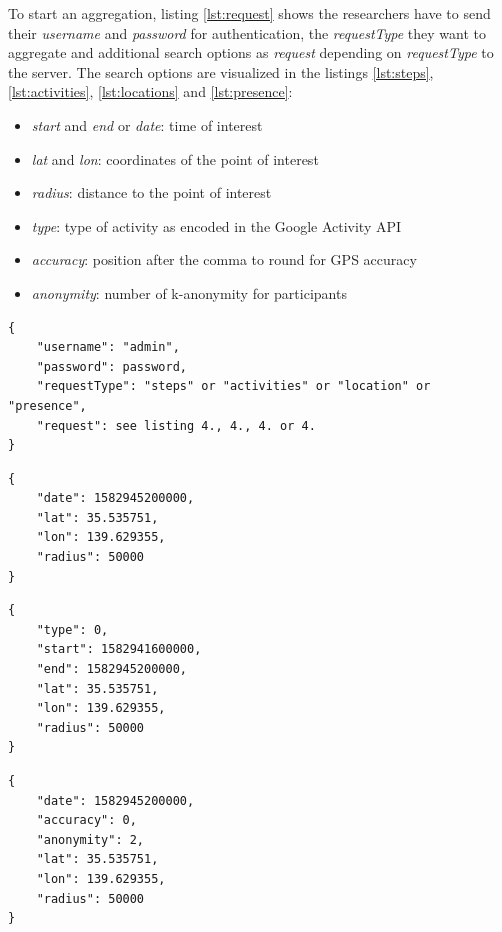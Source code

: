 To start an aggregation, listing \ref{lst:request} shows the researchers have to send their \textit{username} and \textit{password} for authentication, the \textit{requestType} they want to aggregate and additional search options as \textit{request} depending on \textit{requestType} to the server. The search options are visualized in the listings \ref{lst:steps}, \ref{lst:activities}, \ref{lst:locations} and \ref{lst:presence}:
\begin{itemize}
    \item \textit{start} and \textit{end} or \textit{date}: time of interest
    \item \textit{lat} and \textit{lon}: coordinates of the point of interest
    \item \textit{radius}: distance to the point of interest
    \item \textit{type}: type of activity as encoded in the Google Activity API
    \item \textit{accuracy}: position after the comma to round for GPS accuracy
    \item \textit{anonymity}: number of k-anonymity for participants
\end{itemize}

\begin{lstlisting}[caption=Initial aggregation request from researcher, label={lst:request}]
{
    "username": "admin",
    "password": password,
    "requestType": "steps" or "activities" or "location" or "presence",
    "request": see listing 4., 4., 4. or 4.
}
\end{lstlisting}

\begin{lstlisting}[caption=Search options for steps, label={lst:steps}]
{
    "date": 1582945200000,
    "lat": 35.535751,
    "lon": 139.629355,
    "radius": 50000
}
\end{lstlisting}

\begin{lstlisting}[caption=Search options for activities, label={lst:activities}]
{
    "type": 0,
    "start": 1582941600000,
    "end": 1582945200000,
    "lat": 35.535751,
    "lon": 139.629355,
    "radius": 50000
}
\end{lstlisting}

\begin{lstlisting}[caption=Search options for locations, label={lst:locations}]
{
    "date": 1582945200000,
    "accuracy": 0,
    "anonymity": 2,
    "lat": 35.535751,
    "lon": 139.629355,
    "radius": 50000
}
\end{lstlisting}

